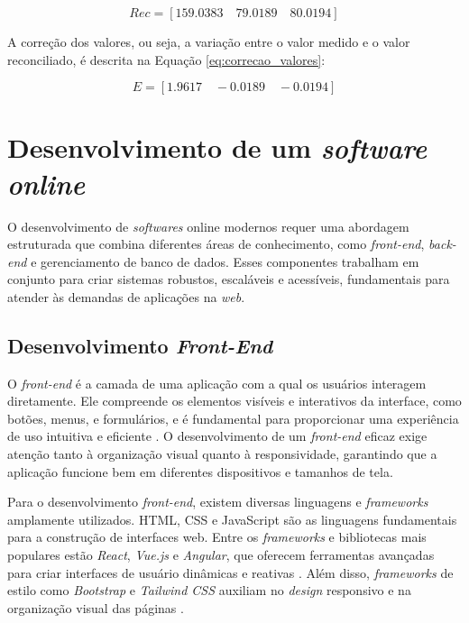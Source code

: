 \begin{equation}
    Rec = [159.0383 \quad 79.0189 \quad 80.0194]
    \label{eq:medidas_reconciliadas}
\end{equation}

A correção dos valores, ou seja, a variação entre o valor medido e o valor reconciliado, é descrita na Equação \eqref{eq:correcao_valores}:

\begin{equation}
    E = [1.9617 \quad -0.0189 \quad -0.0194 ]
    \label{eq:correcao_valores}
\end{equation}



\section{Desenvolvimento de um \textit{software online}}

O desenvolvimento de \textit{softwares} online modernos requer uma abordagem estruturada que combina diferentes áreas de conhecimento, como \textit{front-end}, \textit{back-end} e gerenciamento de banco de dados. Esses componentes trabalham em conjunto para criar sistemas robustos, escaláveis e acessíveis, fundamentais para atender às demandas de aplicações na \textit{web}.

\subsection{Desenvolvimento \textit{Front-End}}

O \textit{front-end} é a camada de uma aplicação com a qual os usuários interagem diretamente. Ele compreende os elementos visíveis e interativos da interface, como botões, menus, e formulários, e é fundamental para proporcionar uma experiência de uso intuitiva e eficiente \cite{frontendrole}. O desenvolvimento de um \textit{front-end} eficaz exige atenção tanto à organização visual quanto à responsividade, garantindo que a aplicação funcione bem em diferentes dispositivos e tamanhos de tela.

Para o desenvolvimento \textit{front-end}, existem diversas linguagens e \textit{frameworks} amplamente utilizados. HTML, CSS e JavaScript são as linguagens fundamentais para a construção de interfaces web. Entre os \textit{frameworks} e bibliotecas mais populares estão \textit{React}, \textit{Vue.js} e \textit{Angular}, que oferecem ferramentas avançadas para criar interfaces de usuário dinâmicas e reativas \cite{reactbook}. Além disso, \textit{frameworks} de estilo como \textit{Bootstrap} e \textit{Tailwind CSS} auxiliam no \textit{design} responsivo e na organização visual das páginas \cite{bootstrapdoc}.

